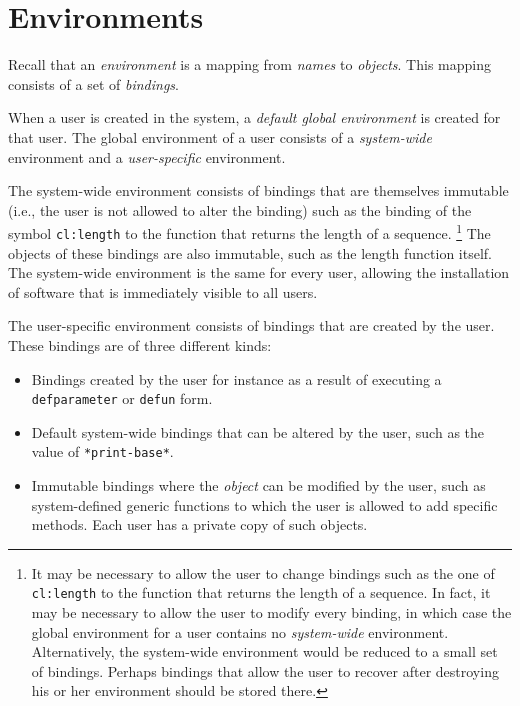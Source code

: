 \chapter{Environments}
\label{chap-environments}

Recall that an \emph{environment} is a mapping from \emph{names} to
\emph{objects}.  This mapping consists of a set of \emph{bindings}. 

When a user is created in the system, a \emph{default global
  environment} is created for that user.   The global environment of a
user consists of a \emph{system-wide} environment and a
\emph{user-specific} environment.

The system-wide environment consists of bindings that are themselves
immutable (i.e., the user is not allowed to alter the binding) such as
the binding of the symbol \texttt{cl:length} to the function that
returns the length of a sequence.%
\footnote{It may be necessary to allow the user to change bindings
  such as the one of \texttt{cl:length} to the function that returns
  the length of a sequence.  In fact, it may be necessary to allow the
  user to modify every binding, in which case the global environment
  for a user contains no \emph{system-wide} environment.
  Alternatively, the system-wide environment would be reduced to a
  small set of bindings.  Perhaps bindings that allow the user to
  recover after destroying his or her environment should be stored
  there. }
The objects of these bindings are
also immutable, such as the length function itself.  The system-wide
environment is the same for every user, allowing the installation of
software that is immediately visible to all users. 

The user-specific environment consists of bindings that are created by
the user.  These bindings are of three different kinds:

\begin{itemize}
\item Bindings created by the user for instance as a result of
  executing a \texttt{defparameter} or \texttt{defun} form.
\item Default system-wide bindings that can be altered by the user,
  such as the value of \texttt{*print-base*}.
\item Immutable bindings where the \emph{object} can be modified by
  the user, such as system-defined generic functions to which the user
  is allowed to add specific methods.  Each user has a private copy of
  such objects.
\end{itemize}


